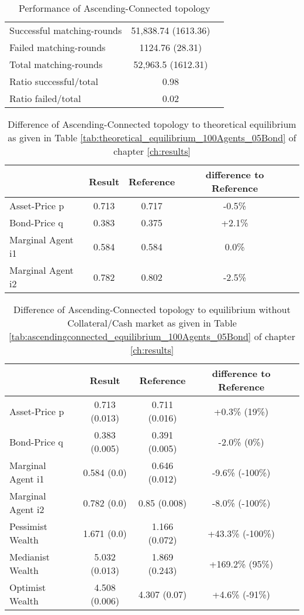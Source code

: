 \documentclass[Bachelorarbeit.tex]{subfiles}
\begin{document}
\begin{table}[H]
	\caption{Performance of Ascending-Connected topology}
	\centering
	\begin{tabular} { l c r }
		\hline
		Successful matching-rounds & 51,838.74 (1613.36) \\
		Failed matching-rounds & 1124.76 (28.31) \\
		Total matching-rounds & 52,963.5 (1612.31) \\
		\hline
		Ratio successful/total & 0.98 \\
		Ratio failed/total & 0.02 \\
		\hline
	\end{tabular}
\end{table}

\begin{table}[H]
	\caption{Difference of Ascending-Connected topology to theoretical equilibrium as given in Table \ref{tab:theoretical_equilibrium_100Agents_05Bond} of chapter \ref{ch:results}}
	\centering
	\begin{tabular} { l c c c r }
		& Result & Reference & difference to Reference \\
		\hline
		Asset-Price p & 0.713 & 0.717 & -0.5\% \\
		Bond-Price q & 0.383 & 0.375 & +2.1\% \\
		Marginal Agent i1 & 0.584 & 0.584 & 0.0\% \\
		Marginal Agent i2 & 0.782 & 0.802 & -2.5\% \\
		\hline
	\end{tabular}
\end{table} 

\begin{table}[H]
	\caption{Difference of Ascending-Connected topology to equilibrium without Collateral/Cash market as given in Table \ref{tab:ascendingconnected_equilibrium_100Agents_05Bond} of chapter \ref{ch:results}}
	\centering
	\begin{tabular} { l c c c r }
		& Result & Reference & difference to Reference \\
		\hline
		Asset-Price p & 0.713 (0.013) & 0.711 (0.016) & +0.3\% (19\%) \\
		Bond-Price q & 0.383 (0.005) & 0.391 (0.005) & -2.0\% (0\%) \\
		Marginal Agent i1 & 0.584 (0.0) & 0.646 (0.012) & -9.6\% (-100\%) \\
		Marginal Agent i2 & 0.782 (0.0) & 0.85 (0.008) & -8.0\% (-100\%) \\
		\hline
		Pessimist Wealth & 1.671 (0.0) & 1.166 (0.072) & +43.3\% (-100\%) \\
		Medianist Wealth & 5.032 (0.013) & 1.869 (0.243) & +169.2\% (95\%) \\
		Optimist Wealth & 4.508 (0.006) & 4.307 (0.07) & +4.6\% (-91\%) \\
		\hline
	\end{tabular}
\end{table}
\end{document}
